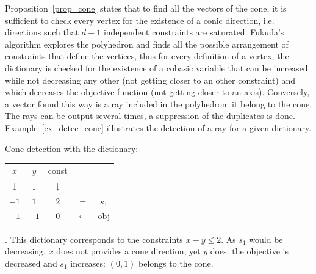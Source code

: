 Proposition~\ref{prop_cone} states that to find all the vectors of the cone, it is sufficient to check every vertex for the existence of a conic direction, i.e. directions such that $d-1$ independent constraints are saturated. Fukuda's algorithm explores the polyhedron and finds all the possible arrangement of constraints that define the vertices, thus for every definition of a vertex, the dictionary is checked for the existence of a cobasic variable that can be increased while not decreasing any other (not getting closer to an other constraint) and which decreases the objective function (not getting closer to an axis). Conversely, a vector found this way is a ray included in the polyhedron: it belong to the cone. The rays can be output several times, a suppression of the duplicates is done. Example~\ref{ex_detec_cone} illustrates the detection of a ray for a given dictionary.

\begin{example}
\begin{multicols}{2}	
	Cone detection with the dictionary:
	\begin{tabular}{| c | c || c || c c |}
	\hline	
	$x$ & $y$ & const & & \\
	$\downarrow$ & $\downarrow$ &$\downarrow$  & & \\
	\hline
	\hline		
   	$-1$ & $1$ & $2$ & = & $s_1$\\ \hline \hline	
   	$-1$ & $-1$ & $0$ & $\leftarrow$ & obj  \\
   	\hline
   	\end{tabular}. This dictionary corresponds to the constraints $x-y\leq 2$. As $s_1$ would be decreasing, $x$ does not provides a cone direction, yet $y$ does: the objective is decreased and $s_1$ increases: $(0,1)$ belongs to the cone.\\

\columnbreak

\end{multicols}
\label{ex_detec_cone}
\end{example}

